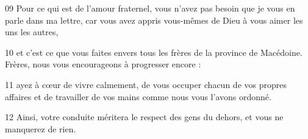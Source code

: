 
09 Pour ce qui est de l’amour fraternel, vous n’avez pas besoin que je vous en parle dans ma lettre, car vous avez appris vous-mêmes de Dieu à vous aimer les uns les autres,

10 et c’est ce que vous faites envers tous les frères de la province de Macédoine. Frères, nous vous encourageons à progresser encore :

11 ayez à cœur de vivre calmement, de vous occuper chacun de vos propres affaires et de travailler de vos mains comme nous vous l’avons ordonné.

12 Ainsi, votre conduite méritera le respect des gens du dehors, et vous ne manquerez de rien.